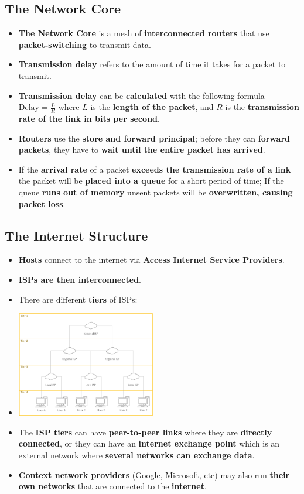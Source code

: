 \documentclass{article}
\begin{document}
   \subsection*{The Network Core}
   \begin{itemize}
       \item \textbf{The Network Core} is a mesh of \textbf{interconnected routers} that use \textbf{packet-switching} to transmit data.
       \item \textbf{Transmission delay} refers to the amount of time it takes for a packet to transmit.
       \item \textbf{Transmission delay} can be \textbf{calculated} with the following formula $\text{Delay}=\frac{L}{R}$ where $L$ is the \textbf{length of the packet}, and $R$ is the \textbf{transmission rate of the link in bits per second}.
       \item \textbf{Routers} use the \textbf{store and forward principal}; before they can \textbf{forward packets}, they have to \textbf{wait until the entire packet has arrived}.
       \item If the \textbf{arrival rate} of a packet \textbf{exceeds the transmission rate of a link} the packet will be \textbf{placed into a queue} for a short period of time; If the queue \textbf{runs out of memory} unsent packets will be \textbf{overwritten, causing packet loss}.
   \end{itemize}

   \subsection*{The Internet Structure}
   \begin{itemize}
       \item \textbf{Hosts} connect to the internet via \textbf{Access Internet Service Providers}.
       \item \textbf{ISPs are then interconnected}.
       \item There are different \textbf{tiers} of ISPs:
       \item[] \includegraphics[height=175px]{images/ISP-Structure.png}
       \item The \textbf{ISP tiers} can have \textbf{peer-to-peer links} where they are \textbf{directly connected}, or they can have an \textbf{internet exchange point} which is an external network where \textbf{several networks can exchange data}.
       \item \textbf{Context network providers} (Google, Microsoft, etc) may also run \textbf{their own networks} that are connected to the \textbf{internet}.
   \end{itemize}
\end{document}
